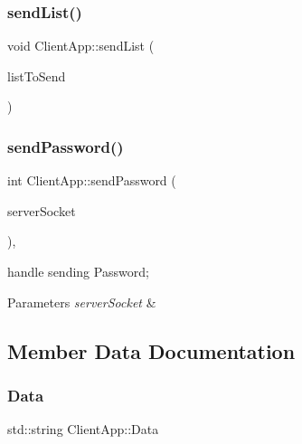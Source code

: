 \mbox{\label{class_client_app_ad42207c20cb3dcda4a1adb60a07d13db}} 
\subsubsection{\texorpdfstring{send\+List()}{sendList()}\hspace{0.1cm}{\footnotesize\ttfamily [3/3]}}
{\footnotesize\ttfamily void Client\+App\+::send\+List (\begin{DoxyParamCaption}\item[{\hyperlink{class_linked_list}{Linked\+List}$<$ int $>$}]{list\+To\+Send }\end{DoxyParamCaption})}

\mbox{\label{class_client_app_a641103eef19d7e08c87d22478c6904f0}} 
\subsubsection{\texorpdfstring{send\+Password()}{sendPassword()}}
{\footnotesize\ttfamily int Client\+App\+::send\+Password (\begin{DoxyParamCaption}\item[{int}]{server\+Socket }\end{DoxyParamCaption})\hspace{0.3cm}{\ttfamily [protected]}, {\ttfamily [virtual]}}



handle sending Password; 


\begin{DoxyParams}{Parameters}
{\em server\+Socket} & \\
\hline
\end{DoxyParams}


\subsection{Member Data Documentation}
\mbox{\label{class_client_app_a130ab0916e0079bfb00ea09f8a2665f8}} 
\subsubsection{\texorpdfstring{Data}{Data}}
{\footnotesize\ttfamily std\+::string Client\+App\+::\+Data}

